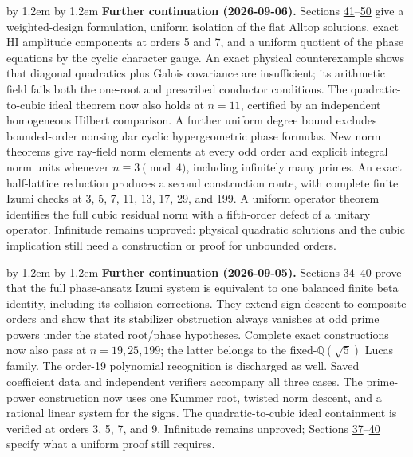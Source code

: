 \documentclass[11pt,reqno]{amsart}
\theoremstyle{plain}
\newenvironment{revnote}%
  {\par\addvspace{0.7\baselineskip}\begingroup\small
   \advance\leftskip by 1.2em \advance\rightskip by 1.2em \noindent\ignorespaces}%
  {\par\endgroup\addvspace{0.7\baselineskip}}
\begin{document}
\begin{revnote}
\textbf{Further continuation (2026-09-06).} Sections \hyperref[sec:41]{41}--\hyperref[sec:50]{50} give a weighted-design formulation, uniform isolation of the flat Alltop solutions, exact HI amplitude components at orders 5 and 7, and a uniform quotient of the phase equations by the cyclic character gauge. An exact physical counterexample shows that diagonal quadratics plus Galois covariance are insufficient; its arithmetic field fails both the one-root and prescribed conductor conditions. The quadratic-to-cubic ideal theorem now also holds at \(n=11\), certified by an independent homogeneous Hilbert comparison. A further uniform degree bound excludes bounded-order nonsingular cyclic hypergeometric phase formulas. New norm theorems give ray-field norm elements at every odd order and explicit integral norm units whenever \(n\equiv3\pmod4\), including infinitely many primes. An exact half-lattice reduction produces a second construction route, with complete finite Izumi checks at 3, 5, 7, 11, 13, 17, 29, and 199. A uniform operator theorem identifies the full cubic residual norm with a fifth-order defect of a unitary operator. Infinitude remains unproved: physical quadratic solutions and the cubic implication still need a construction or proof for unbounded orders.
\end{revnote}

\begin{revnote}
\textbf{Further continuation (2026-09-05).} Sections \hyperref[sec:34]{34}--\hyperref[sec:40]{40} prove that the full phase-ansatz Izumi system is equivalent to one balanced finite beta identity, including its collision corrections. They extend sign descent to composite orders and show that its stabilizer obstruction always vanishes at odd prime powers under the stated root/phase hypotheses. Complete exact constructions now also pass at \(n=19,25,199\); the latter belongs to the fixed-\(\mathbb Q(\sqrt5)\) Lucas family. The order-19 polynomial recognition is discharged as well. Saved coefficient data and independent verifiers accompany all three cases. The prime-power construction now uses one Kummer root, twisted norm descent, and a rational linear system for the signs. The quadratic-to-cubic ideal containment is verified at orders 3, 5, 7, and 9. Infinitude remains unproved; Sections \hyperref[sec:37]{37}--\hyperref[sec:40]{40} specify what a uniform proof still requires.
\end{revnote}
\end{document}
